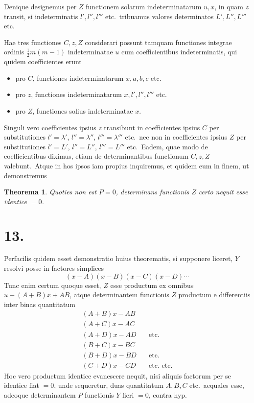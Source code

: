 \documentclass[12pt,a4paper]{article}
\theoremstyle{plain}
\newtheorem{theorema}{Theorema}[section]
\begin{document}
Denique designemus per $Z$ functionem solarum indeterminatarum $u, x$, in
quam $z$ transit, si indeterminatis $l', l'', l'''$ etc.\ tribuamus valores determinatos
$L', L'', L'''$ etc.

Hae tres functiones $C, z, Z$ considerari possunt tamquam functiones integrae ordinis $\frac{1}{2}m(m-1)$ indeterminatae $u$ cum coefficientibus indeterminatis, qui
quidem coefficientes erunt
\begin{itemize}
\item pro $C$, functiones indeterminatarum $x, a, b, c$ etc.
\item pro $z$, functiones indeterminatarum $x, l', l'', l'''$ etc.
\item pro $Z$, functiones solius indeterminatae $x$.
\end{itemize}

Singuli vero coefficientes ipsius $z$ transibunt in coefficientes ipsius $C$ per substitutiones $l' = \lambda'$, $l'' = \lambda''$, $l''' = \lambda'''$ etc.\ nec non in coefficientes ipsius $Z$ per substitutiones $l' = L'$, $l'' = L''$, $l''' = L'''$ etc.\ Eadem, quae modo de coefficientibus diximus, etiam de determinantibus functionum $C, z, Z$ valebunt.\ Atque in
hos ipsos iam propius inquiremus, et quidem eum in finem, ut demonstremus

\begin{theorema}
Quoties non est $P = 0$, determinans functionis $Z$ certo nequit
esse identice $= 0$.
\end{theorema}

\section*{13.}

Perfacilis quidem esset demonstratio huius theorematis, si supponere liceret, $Y$ resolvi posse in factores simplices
\[
(x-A)(x-B)(x-C)(x-D) \cdots
\]
Tunc enim certum quoque esset, $Z$ esse productum ex omnibus $u - (A+B)x + AB$,
atque determinantem functionis $Z$ productum e differentiis inter binas quantitatum
\begin{align*}
(A+B)x - AB \\
(A+C)x - AC \\
(A+D)x - AD &\quad \text{etc.} \\
(B+C)x - BC \\
(B+D)x - BD &\quad \text{etc.} \\
(C+D)x - CD &\quad \text{etc.\ etc.}
\end{align*}
Hoc vero productum identice evanescere nequit, nisi aliquis factorum per se identice fiat $= 0$, unde sequeretur, duas quantitatum $A, B, C$ etc.\ aequales esse,
adeoque determinantem $P$ functionis $Y$ fieri $= 0$, contra hyp.
\end{document}
